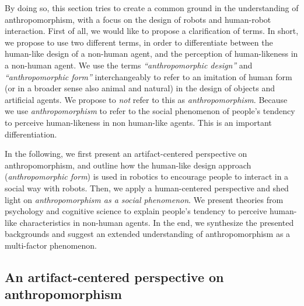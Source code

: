 \documentclass{frontiersSCNS} %
\begin{document}
By doing so, this section tries to create a common ground in the understanding of 
anthropomorphism, with a focus on the design of robots and human-robot interaction. 
First of all, we would like to propose a clarification of terms.
In short, we propose to use two different terms, in order to differentiate between the human-like design of a non-human agent, and the perception of human-likeness in a non-human agent.
We use the terms \textit{``anthropomorphic design''} and \textit{``anthropomorphic 
form''} interchangeably to refer to an imitation of human form (or in a broader sense 
also animal and natural) in the design of objects and artificial agents. We propose to 
\textit{not} refer to this as \textit{anthropomorphism}.
Because we use \textit{anthropomorphism} to refer to the social phenomenon of 
people's tendency to perceive human-likeness in non human-like agents. This is an important differentiation.

In the following, we first present an artifact-centered perspective on anthropomorphism, and outline how 
the human-like design approach (\textit{anthropomorphic form}) is used in robotics to encourage 
people to interact in a social way with robots. Then, we apply a human-centered 
perspective and shed light on \textit{anthropomorphism as a social phenomenon}. We present 
theories from psychology and cognitive science to explain people's tendency to 
perceive human-like characteristics in non-human agents. In the end, we synthesize 
the presented backgrounds and suggest an extended understanding of anthropomorphism 
as a multi-factor phenomenon.


%
%
%
%
%
%

\subsection{An artifact-centered perspective on anthropomorphism}
\label{sec:anthropomorphic-design}
\end{document}

